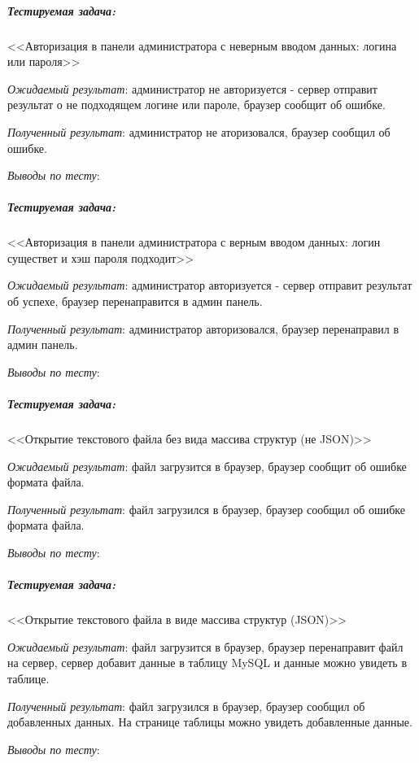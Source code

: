 
\subparagraph{Тестируемая задача:} <<Авторизация в панели администратора с неверным вводом данных: логина или пароля>>

\textit{Ожидаемый результат}: администратор не авторизуется - сервер отправит результат о не подходящем логине или пароле,
браузер сообщит об ошибке.

\textit{Полученный результат}: администратор не аторизовался, браузер сообщил об ошибке.

\textit{Выводы по тесту}: 


\subparagraph{Тестируемая задача:} <<Авторизация в панели администратора с верным вводом данных: логин существет и хэш пароля подходит>>

\textit{Ожидаемый результат}: администратор авторизуется - сервер отправит результат об успехе,
браузер перенаправится в админ панель.

\textit{Полученный результат}: администратор авторизовался, браузер перенаправил в админ панель.

\textit{Выводы по тесту}: 


\subparagraph{Тестируемая задача:} <<Открытие текстового файла без вида массива структур (не JSON)>>

\textit{Ожидаемый результат}: файл загрузится в браузер, браузер сообщит об ошибке формата файла.

\textit{Полученный результат}: файл загрузился в браузер, браузер сообщил об ошибке формата файла.

\textit{Выводы по тесту}:


\subparagraph{Тестируемая задача:} <<Открытие текстового файла в виде массива структур (JSON)>>

\textit{Ожидаемый результат}: файл загрузится в браузер, браузер перенаправит файл на сервер,
сервер добавит данные в таблицу MySQL и данные можно увидеть в таблице.

\textit{Полученный результат}: файл загрузился в браузер, браузер сообщил об добавленных данных.
На странице таблицы можно увидеть добавленные данные.

\textit{Выводы по тесту}:

